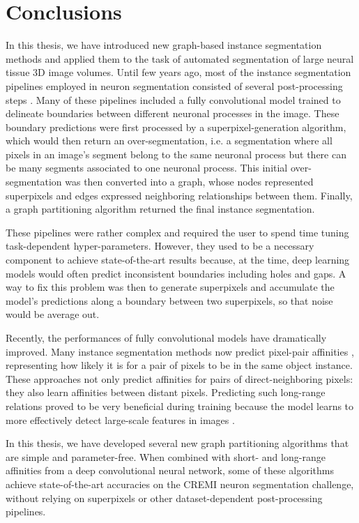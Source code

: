 

\chapter*{Conclusions}
In this thesis, we have introduced new graph-based instance segmentation methods and applied them to the task of automated segmentation of large neural tissue 3D image volumes. 
Until few years ago, most of the instance segmentation pipelines employed in neuron segmentation consisted of several post-processing steps . Many of these pipelines included a fully convolutional model trained to delineate boundaries between different neuronal processes in the image. These boundary predictions were first processed by a superpixel-generation algorithm, which would then return an over-segmentation, i.e. a segmentation where all pixels in an image's segment belong to the same neuronal process but there can be many segments associated to one neuronal process. This initial over-segmentation was then converted into a graph, whose nodes represented superpixels and edges expressed neighboring relationships between them. Finally, a graph partitioning algorithm returned the final instance segmentation. 

These pipelines were rather complex and required the user to spend time tuning task-dependent hyper-parameters. However, they used to be a necessary component to achieve state-of-the-art results because, at the time, deep learning models would often predict inconsistent boundaries including holes and gaps. A way to fix this problem was then to generate superpixels and accumulate the model's predictions along a boundary between two superpixels, so that noise would be average out. 

Recently, the performances of fully convolutional models have dramatically improved. Many instance segmentation methods now predict pixel-pair affinities \cite{Gao_2019_ICCV,liu2018affinity,lee2017superhuman}, representing how likely it is for a pair of pixels to be in the same object instance. These approaches not only predict affinities for pairs of direct-neighboring pixels: they also learn affinities between distant pixels. Predicting such long-range relations proved to be very beneficial during training because the model learns to more effectively detect large-scale features in images \cite{lee2017superhuman}. 

In this thesis, we have developed several new graph partitioning algorithms that are simple and parameter-free. When combined with short- and long-range affinities from a deep convolutional neural network, some of these algorithms achieve state-of-the-art accuracies on the CREMI neuron segmentation challenge, without relying on superpixels or other dataset-dependent post-processing pipelines.

